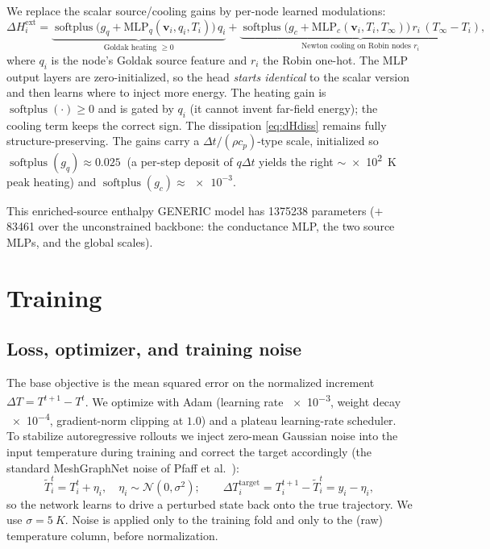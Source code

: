\documentclass[11pt]{article}
\newcommand{\Tinf}{T_{\infty}}
\newcommand{\softplus}{\operatorname{softplus}}
\theoremstyle{definition}
\begin{document}
We replace the scalar source/cooling gains by per-node learned modulations:
\begin{equation}
  \Delta H_i^{\mathrm{ext}}
  = \underbrace{\softplus\!\big(g_q+\mathrm{MLP}_q(\bm v_i,q_i,T_i)\big)\,q_i}
    _{\text{Goldak heating }\ge 0}
  + \underbrace{\softplus\!\big(g_c+\mathrm{MLP}_c(\bm v_i,T_i,\Tinf)\big)\,
    r_i\,(\Tinf-T_i)}_{\text{Newton cooling on Robin nodes }r_i},
  \label{eq:enriched}
\end{equation}
where $q_i$ is the node's Goldak source feature and $r_i$ the Robin one-hot. The MLP
output layers are zero-initialized, so the head \emph{starts identical} to the scalar
version and then learns where to inject more energy. The heating gain is
$\softplus(\cdot)\ge0$ and is gated by $q_i$ (it cannot invent far-field energy); the
cooling term keeps the correct sign. The dissipation \cref{eq:dHdiss} remains fully
structure-preserving. The gains carry a $\Delta t/(\rho c_p)$-type scale, initialized so
$\softplus(g_q)\approx\SI{0.025}{}$ (a per-step deposit of $q\Delta t$ yields the right
$\sim$\SI{e2}{K} peak heating) and $\softplus(g_c)\approx\num{e-3}$.

This enriched-source enthalpy GENERIC model has \num{1375238} parameters
($+\,$\num{83461} over the unconstrained backbone: the conductance MLP, the two source
MLPs, and the global scales).

\section{Training}
\label{sec:training}

\subsection{Loss, optimizer, and training noise}

The base objective is the mean squared error on the normalized increment
$\Delta T=T^{t+1}-T^{t}$. We optimize with Adam (learning rate \num{e-3}, weight decay
\num{e-4}, gradient-norm clipping at $1.0$) and a plateau learning-rate scheduler. To
stabilize autoregressive rollouts we inject zero-mean Gaussian noise into the input
temperature during training and correct the target accordingly (the standard
MeshGraphNet noise of Pfaff et al.~\cite{pfaff2021learning}):
\begin{equation}
  \tilde T_i^{t}=T_i^{t}+\eta_i,\quad \eta_i\sim\mathcal N(0,\sigma^2);
  \qquad
  \Delta T_i^{\mathrm{target}}=T_i^{t+1}-\tilde T_i^{t}=y_i-\eta_i,
  \label{eq:noise}
\end{equation}
so the network learns to drive a perturbed state back onto the true trajectory. We use
$\sigma=\SI{5}{K}$. Noise is applied only to the training fold and only to the (raw)
temperature column, before normalization.
\end{document}
